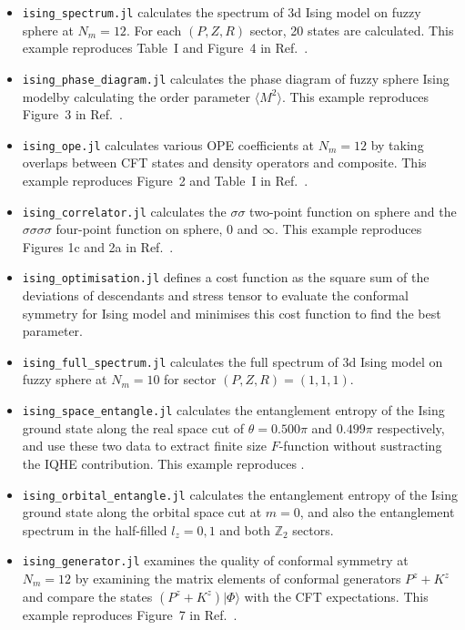 \documentclass{timesjhep}
\begin{document}
\begin{itemize}
    \item \lstinline|ising_spectrum.jl| calculates the spectrum of 3d Ising model on fuzzy sphere at $N_m = 12$. For each $(P,Z,R)$ sector, 20 states are calculated. This example reproduces Table~I and Figure~4 in Ref.~\cite{Zhu2022}.
    \item \lstinline|ising_phase_diagram.jl| calculates the phase diagram of fuzzy sphere Ising modelby calculating the order parameter $\langle M^2\rangle$. This example reproduces Figure~3 in Ref.~\cite{Zhu2022}.
    \item \lstinline|ising_ope.jl| calculates various OPE coefficients at $N_m = 12$ by taking overlaps between CFT states and density operators and composite. This example reproduces Figure~2 and Table~I in Ref.~\cite{Hu2023Mar}.
    \item \lstinline|ising_correlator.jl| calculates the $\sigma\sigma$ two-point function on sphere and the $\sigma\sigma\sigma\sigma$ four-point function on sphere, 0 and $\infty$. This example reproduces Figures 1c and 2a in Ref.~\cite{Han2023Jun}.
    \item \lstinline|ising_optimisation.jl| defines a cost function as the square sum of the deviations of descendants and stress tensor to evaluate the conformal symmetry for Ising model and minimises this cost function to find the best parameter.
    \item \lstinline|ising_full_spectrum.jl| calculates the full spectrum of 3d Ising model on fuzzy sphere at $N_m = 10$ for sector $(P,Z,R) = (1,1,1)$.
    \item \lstinline|ising_space_entangle.jl| calculates the entanglement entropy of the Ising ground state along the real space cut of $\theta = 0.500π$ and $0.499π$ respectively, and use these two data to extract finite size $F$-function without sustracting the IQHE contribution. This example reproduces \cite{Hu2024}.
    \item \lstinline|ising_orbital_entangle.jl| calculates the entanglement entropy of the Ising ground state along the orbital space cut at $m = 0$, and also the entanglement spectrum in the half-filled $l_z = 0, 1$ and  both $\mathbb{Z}_2$ sectors.
    \item \lstinline|ising_generator.jl| examines the quality of conformal symmetry at $N_m = 12$ by examining the matrix elements of conformal generators $P^z + K^z$ and compare the states $(P^z + K^z)|\Phi⟩$ with the CFT expectations. This example reproduces Figure~7 in Ref.~\cite{Fardelli2024}.

\end{itemize}
\end{document}
